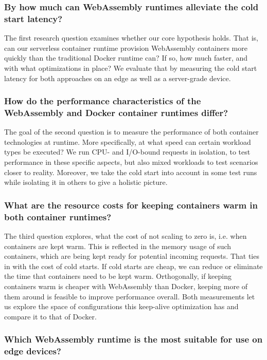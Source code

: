 \subsubsection*{By how much can WebAssembly runtimes alleviate the cold start latency?}

The first research question examines whether our core hypothesis holds. That is, can our serverless container runtime provision WebAssembly containers more quickly than the traditional Docker runtime can? If so, how much faster, and with what optimizations in place? We evaluate that by measuring the cold start latency for both approaches on an edge as well as a server-grade device.

\subsubsection*{How do the performance characteristics of the WebAssembly and Docker container runtimes differ?}

The goal of the second question is to measure the performance of both container technologies at runtime. More specifically, at what speed can certain workload types be executed? We run CPU- and I/O-bound requests in isolation, to test performance in these specific aspects, but also mixed workloads to test scenarios closer to reality. Moreover, we take the cold start into account in some test runs while isolating it in others to give a holistic picture.

\subsubsection*{What are the resource costs for keeping containers warm in both container runtimes?}

The third question explores, what the cost of not scaling to zero is, i.e. when containers are kept warm. This is reflected in the memory usage of such containers, which are being kept ready for potential incoming requests. That ties in with the cost of cold starts. If cold starts are cheap, we can reduce or eliminate the time that containers need to be kept warm. Orthogonally, if keeping containers warm is cheaper with WebAssembly than Docker, keeping more of them around is feasible to improve performance overall. Both measurements let us explore the space of configurations this keep-alive optimization has and compare it to that of Docker.

\subsubsection*{Which WebAssembly runtime is the most suitable for use on edge devices?}

